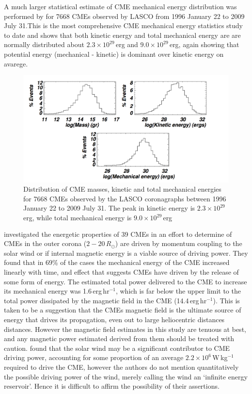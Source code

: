 A much larger statistical estimate of CME mechanical energy distribution was performed by \citep{vour2010} for 7668 CMEs observed by LASCO from 1996 January 22 to 2009 July 31.This is the most comprehensive CME mechanical energy statistics study to date and shows that both kinetic energy and total mechanical energy are are normally distributed about $2.3\times10^{29}$\,erg and $9.0\times10^{29}$\,erg, again showing that potential energy (mechanical - kinetic) is dominant over kinetic energy on avarege.
\begin{figure}[h!]
\begin{center}
\includegraphics[trim = 1cm 0cm 0cm 3cm, scale=0.3]{images/energy_dist}
\caption[Distribution of CME masses, kinetic and total mechanical energies]{Distribution of CME masses, kinetic and total mechanical energies for 7668 CMEs observed by the LASCO
coronagraphs between 1996 January 22 to 2009 July 31. The peak in kinetic energy is $2.3\times10^{29}$\,erg, while total mechanical energy is $9.0\times10^{29}$\,erg \citep{vour2010}}
\label{fig:energy_dist}
\end{center}
\end{figure}

\citep{subram2007} investigated the energetic properties of 39 CMEs in an effort to determine of CMEs in the outer corona ($2-20\,R_{\odot}$) are driven by momentum coupling to the solar wind or if internal magnetic energy is a viable source of driving power. They found that in 69\% of the cases the mechanical energy of the CME increased linearly with time, and effect that suggests CMEs have driven by the release of some form of energy. The estimated total power delivered to the CME to increase its mechanical energy was 1.6\,erg\,hr$^{-1}$, which is far below the upper limit to the total power dissipated by the magnetic field in the CME (14.4\,erg\,hr$^{-1}$). This is taken to be a suggestion that the CMEs magnetic field is the ultimate source of energy that drives its propagation, even out to large heliocentric distances distances. However the magnetic field estimates in this study are tenuous at best, and any magnetic power estimated derived from them should be treated with caution. \citet{lewis2002} found that the solar wind may be a significant contributor to CME driving power, accounting for some proportion of an average $2.2\times10^6$\,W\,kg$^{-1}$ required to drive the CME, however the authors do not mention quantitatively the possible driving power of the wind, merely calling the wind an \textquoteleft infinite energy reservoir'. Hence it is difficult to affirm the possibility of their assertions.

